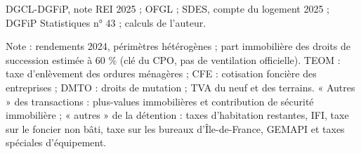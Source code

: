 DGCL-DGFiP, note REI 2025 ; OFGL ; SDES, compte du logement 2025 ; DGFiP Statistiques n° 43 ; calculs de l'auteur.\par Note : rendements 2024, périmètres hétérogènes ; part immobilière des droits de succession estimée à 60 \% (clé du CPO, pas de ventilation officielle). TEOM : taxe d'enlèvement des ordures ménagères ; CFE : cotisation foncière des entreprises ; DMTO : droits de mutation ; TVA du neuf et des terrains. « Autres » des transactions : plus-values immobilières et contribution de sécurité immobilière ; « autres » de la détention : taxes d'habitation restantes, IFI, taxe sur le foncier non bâti, taxe sur les bureaux d'Île-de-France, GEMAPI et taxes spéciales d'équipement.
